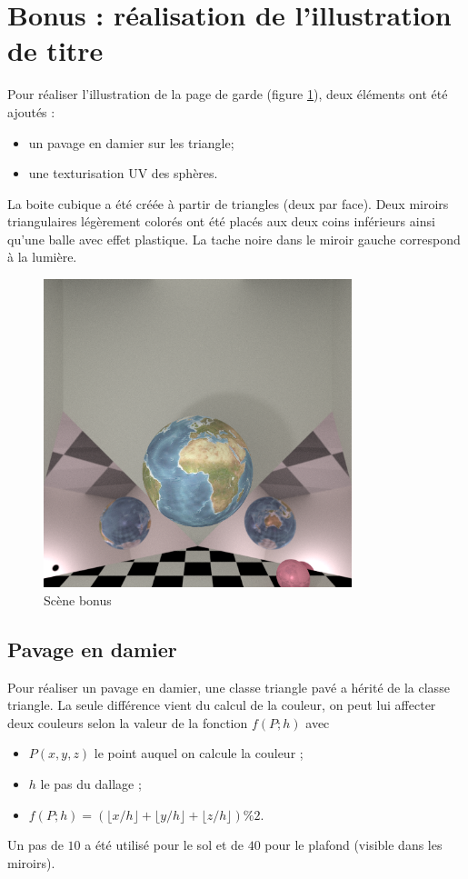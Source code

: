\documentclass[12pt,a4paper,twoside]{report}
\begin{document}
\newpage
\section{Bonus : réalisation de l'illustration de titre}

Pour réaliser l'illustration de la page de garde (figure \ref{fig:illustration}), deux éléments ont été ajoutés :
\begin{itemize}
	\item un pavage en damier sur les triangle;
	\item une texturisation UV des sphères.
\end{itemize}
La boite cubique a été créée à partir de triangles (deux par face). Deux miroirs triangulaires légèrement colorés ont été placés aux deux coins inférieurs ainsi qu'une balle avec effet plastique. La tache noire dans le miroir gauche correspond à la lumière.

\begin{figure}[H]
	\centering
	\includegraphics[width=0.80\textwidth]{illustration}
	\caption{Scène bonus}
	\label{fig:illustration}
\end{figure}

\subsection{Pavage en damier}

Pour réaliser un pavage en damier, une classe triangle pavé a hérité de la classe triangle. La seule différence vient du calcul de la couleur, on peut lui affecter deux couleurs selon la valeur de la fonction $f(P ; h)$ avec
\begin{itemize}
	\item $P(x,y,z)$ le point auquel on calcule la couleur ;
	\item $h$ le pas du dallage ;
	\item $f(P ; h) = \left(\lfloor x/h\rfloor + \lfloor y/h\rfloor +\lfloor z/h\rfloor\right)\%2$.
\end{itemize}
Un pas de $10$ a été utilisé pour le sol et de $40$ pour le plafond (visible dans les miroirs).
\end{document}
